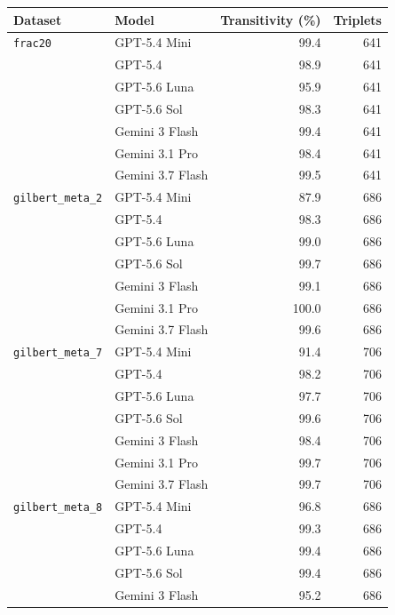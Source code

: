 \documentclass[11pt]{article}
\begin{document}
\begin{table}[p]
  \centering
  \small
  \setlength{\tabcolsep}{10pt}
  \begin{tabular}{llrr}
    \toprule
    Dataset & Model & Transitivity (\%) & Triplets \\
    \midrule
    \texttt{frac20}
      & GPT-5.4 Mini       & 99.4 & 641 \\
      & GPT-5.4            & 98.9 & 641 \\
      & GPT-5.6 Luna       & 95.9 & 641 \\
      & GPT-5.6 Sol        & 98.3 & 641 \\
      & Gemini 3 Flash     & 99.4 & 641 \\
      & Gemini 3.1 Pro     & 98.4 & 641 \\
      & Gemini 3.7 Flash   & 99.5 & 641 \\
    \addlinespace
    \texttt{gilbert\_meta\_2}
      & GPT-5.4 Mini       & 87.9 & 686 \\
      & GPT-5.4            & 98.3 & 686 \\
      & GPT-5.6 Luna       & 99.0 & 686 \\
      & GPT-5.6 Sol        & 99.7 & 686 \\
      & Gemini 3 Flash     & 99.1 & 686 \\
      & Gemini 3.1 Pro     & 100.0 & 686 \\
      & Gemini 3.7 Flash   & 99.6 & 686 \\
    \addlinespace
    \texttt{gilbert\_meta\_7}
      & GPT-5.4 Mini       & 91.4 & 706 \\
      & GPT-5.4            & 98.2 & 706 \\
      & GPT-5.6 Luna       & 97.7 & 706 \\
      & GPT-5.6 Sol        & 99.6 & 706 \\
      & Gemini 3 Flash     & 98.4 & 706 \\
      & Gemini 3.1 Pro     & 99.7 & 706 \\
      & Gemini 3.7 Flash   & 99.7 & 706 \\
    \addlinespace
    \texttt{gilbert\_meta\_8}
      & GPT-5.4 Mini       & 96.8 & 686 \\
      & GPT-5.4            & 99.3 & 686 \\
      & GPT-5.6 Luna       & 99.4 & 686 \\
      & GPT-5.6 Sol        & 99.4 & 686 \\
      & Gemini 3 Flash     & 95.2 & 686 \\

\end{tabular}
\end{table}
\end{document}
